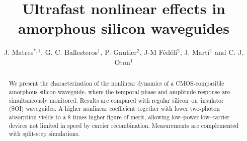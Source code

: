 \documentclass[10pt,letterpaper]{article}
\begin{document}
\title{Ultrafast nonlinear effects in amorphous silicon waveguides}
\author{J. Matres$^{*,1}$, G. C. Ballesteros$^1$, P. Gautier$^2$, J-M F\'ed\'eli$^2$, J. Mart\'i$^1$ and C. J. Oton$^1$} %
\address{$^1$ Nanophotonics Technology Center, \\ Universidad Polit\'ecnica de Valencia, Camino de Vera s/n, 46022, Valencia, Spain\\
$^2$CEA LETI, Minatec Campus, Grenoble 38054, France}



\begin{abstract}
We present the characterization of the nonlinear dynamics of a CMOS-compatible amorphous silicon waveguide, where the temporal phase and amplitude response are simultaneously monitored. Results are compared with regular silicon--on--insulator (SOI) waveguides. A higher nonlinear coefficient together with lower two-photon absorption yields to a 8 times higher figure of merit, allowing low--power low--carrier devices not limited in speed by carrier recombination. Measurements are complemented with split-step simulations.
\end{abstract}


\end{document}
